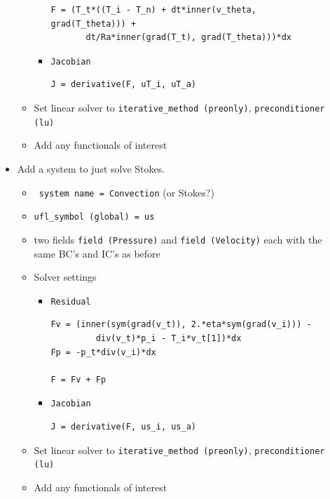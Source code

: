 \begin{description}
\begin{itemize}
\begin{itemize}
\begin{itemize}
\begin{lstlisting}[style=ufl]
F = (T_t*((T_i - T_n) + dt*inner(v_theta, grad(T_theta))) +
       dt/Ra*inner(grad(T_t), grad(T_theta)))*dx
        \end{lstlisting}
\item \texttt{Jacobian}
        \begin{lstlisting}[style=ufl]
J = derivative(F, uT_i, uT_a)
        \end{lstlisting}
      \end{itemize}
    \item Set linear solver to \texttt{iterative\_method (preonly)},
      \texttt{preconditioner (lu)}
    \item Add any functionals of interest

    \end{itemize}

  \item Add a system to just solve Stokes.
    \begin{itemize}
    \item \texttt{ system name = Convection} (or Stokes?)
    \item \texttt{ufl\_symbol (global) = us}
    \item two fields \texttt{field (Pressure)} and \texttt{field
        (Velocity)} each  with the same BC's
      and IC's as before
    \item Solver settings
      \begin{itemize}
      \item \texttt{Residual}
        \begin{lstlisting}[style=ufl]
Fv = (inner(sym(grad(v_t)), 2.*eta*sym(grad(v_i))) - 
         div(v_t)*p_i - T_i*v_t[1])*dx
Fp = -p_t*div(v_i)*dx

F = Fv + Fp          
        \end{lstlisting}
\item \texttt{Jacobian}
        \begin{lstlisting}[style=ufl]
J = derivative(F, us_i, us_a)
        \end{lstlisting}
      \end{itemize}
    \item Set linear solver to \texttt{iterative\_method (preonly)},
      \texttt{preconditioner (lu)}
    \item Add any functionals of interest
    \end{itemize}
  \end{itemize}
\end{description}




